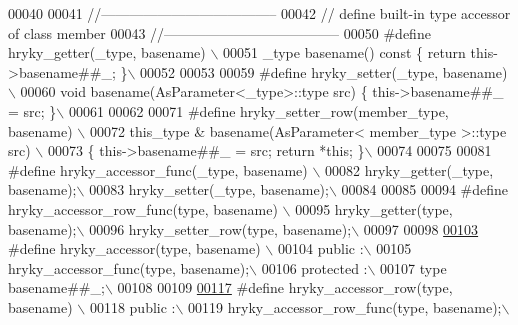 \begin{DoxyCode}
00040 
00041 \textcolor{comment}{//--------------------------------------}
00042 \textcolor{comment}{// define built-in type accessor of class member}
00043 \textcolor{comment}{//--------------------------------------}
00050 \textcolor{comment}{}\textcolor{preprocessor}{#define hryky\_getter(\_type, basename) \(\backslash\)}
00051 \textcolor{preprocessor}{    \_type basename() const \{ return this->basename##\_; \}\(\backslash\)}
00052 \textcolor{preprocessor}{}
00053 \textcolor{preprocessor}{}
00059 \textcolor{preprocessor}{#define hryky\_setter(\_type, basename) \(\backslash\)}
00060 \textcolor{preprocessor}{    void basename(AsParameter<\_type>::type src) \{ this->basename##\_ = src; \}\(\backslash\)}
00061 \textcolor{preprocessor}{}
00062 \textcolor{preprocessor}{}
00071 \textcolor{preprocessor}{#define hryky\_setter\_row(member\_type, basename) \(\backslash\)}
00072 \textcolor{preprocessor}{    this\_type & basename(AsParameter< member\_type >::type src) \(\backslash\)}
00073 \textcolor{preprocessor}{    \{ this->basename##\_ = src; return *this; \}\(\backslash\)}
00074 \textcolor{preprocessor}{}
00075 \textcolor{preprocessor}{}
00081 \textcolor{preprocessor}{#define hryky\_accessor\_func(\_type, basename) \(\backslash\)}
00082 \textcolor{preprocessor}{    hryky\_getter(\_type, basename);\(\backslash\)}
00083 \textcolor{preprocessor}{    hryky\_setter(\_type, basename);\(\backslash\)}
00084 \textcolor{preprocessor}{}
00085 \textcolor{preprocessor}{}
00094 \textcolor{preprocessor}{#define hryky\_accessor\_row\_func(type, basename) \(\backslash\)}
00095 \textcolor{preprocessor}{    hryky\_getter(type, basename);\(\backslash\)}
00096 \textcolor{preprocessor}{    hryky\_setter\_row(type, basename);\(\backslash\)}
00097 \textcolor{preprocessor}{}
00098 \textcolor{preprocessor}{}
\hypertarget{common_8h_source_l00103}{}\hyperlink{common_8h_a80b197d8fe7a5d4aca402c77703278d7}{00103} \textcolor{preprocessor}{#define hryky\_accessor(type, basename) \(\backslash\)}
00104 \textcolor{preprocessor}{    public :\(\backslash\)}
00105 \textcolor{preprocessor}{        hryky\_accessor\_func(type, basename);\(\backslash\)}
00106 \textcolor{preprocessor}{    protected :\(\backslash\)}
00107 \textcolor{preprocessor}{        type basename##\_;\(\backslash\)}
00108 \textcolor{preprocessor}{}
00109 \textcolor{preprocessor}{}
\hypertarget{common_8h_source_l00117}{}\hyperlink{common_8h_a53c1a7f63ecaf9a35fedc7c6ca996e84}{00117} \textcolor{preprocessor}{#define hryky\_accessor\_row(type, basename) \(\backslash\)}
00118 \textcolor{preprocessor}{    public :\(\backslash\)}
00119 \textcolor{preprocessor}{        hryky\_accessor\_row\_func(type, basename);\(\backslash\)}

\end{DoxyCode}
